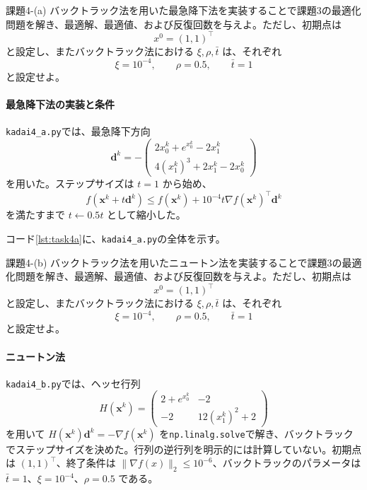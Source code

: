 \documentclass[a4j]{jarticle}
\begin{document}
\begin{itembox}[l]{課題4-(a)}
バックトラック法を用いた最急降下法を実装することで課題3の最適化問題を解き、最適解、最適値、および反復回数を与えよ。ただし、初期点は
\[
x^0=(1,1)^\top
\]
と設定し、またバックトラック法における $\xi,\rho,\bar t$ は、それぞれ
\[
\xi=10^{-4},\qquad\rho=0.5,\qquad\bar t=1
\]
と設定せよ。
\end{itembox}
\paragraph{最急降下法の実装と条件}

\texttt{kadai4\_a.py}では、最急降下方向
\[
  \bm{d}^k=-\begin{pmatrix}
    2x_0^k+e^{x_0^k}-2x_1^k\\
    4(x_1^k)^3+2x_1^k-2x_0^k
  \end{pmatrix}
\]
を用いた。ステップサイズは $t=1$ から始め、
\[
  f(\bm{x}^k+t\bm{d}^k)
  \le f(\bm{x}^k)+10^{-4}t\nabla f(\bm{x}^k)^\top\bm{d}^k
\]
を満たすまで $t\leftarrow0.5t$ として縮小した。
\par\noindent
コード\ref{lst:task4a}に、\texttt{kadai4\_a.py}の全体を示す。
\par




\begin{itembox}[l]{課題4-(b)}
バックトラック法を用いたニュートン法を実装することで課題3の最適化問題を解き、最適解、最適値、および反復回数を与えよ。ただし、初期点は
\[
x^0=(1,1)^\top
\]
と設定し、またバックトラック法における $\xi,\rho,\bar t$ は、それぞれ
\[
\xi=10^{-4},\qquad\rho=0.5,\qquad\bar t=1
\]
と設定せよ。
\end{itembox}
\paragraph{ニュートン法}

\texttt{kadai4\_b.py}では、ヘッセ行列
\[
  H(\bm{x}^k)=\begin{pmatrix}
    2+e^{x_0^k}&-2\\
    -2&12(x_1^k)^2+2
  \end{pmatrix}
\]
を用いて $H(\bm{x}^k)\bm{d}^k=-\nabla f(\bm{x}^k)$ を\texttt{np.linalg.solve}で解き、バックトラックでステップサイズを決めた。行列の逆行列を明示的には計算していない。初期点は $(1,1)^\top$、終了条件は $\|\nabla f(x)\|_2\le10^{-6}$、バックトラックのパラメータは $\bar t=1$、$\xi=10^{-4}$、$\rho=0.5$ である。
\end{document}
